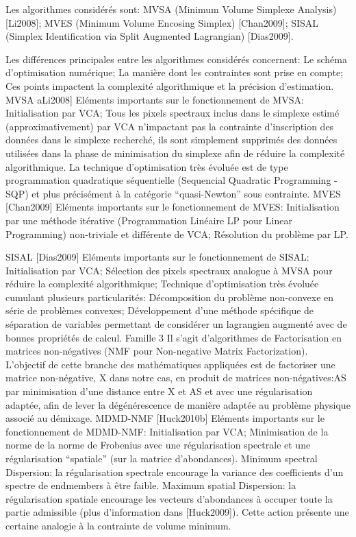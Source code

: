 Les algorithmes considérés sont: MVSA (Minimum Volume Simplexe
Analysis) [Li2008]; MVES (Minimum Volume Encosing Simplex)
[Chan2009]; SISAL (Simplex Identification via Split Augmented
Lagrangian) [Dias2009]. 

Les différences principales entre les algorithmes considérés
concernent: 
Le schéma d'optimisation numérique; 
La manière dont les
contraintes sont prise en compte; 
Ces points impactent la complexité
algorithmique et la précision d'estimation.  MVSA aLi2008] Eléments
  importants sur le fonctionnement de MVSA: Initialisation par VCA;
  Tous les pixels spectraux inclus dans le simplexe estimé
  (approximativement) par VCA n'impactant pas la contrainte
  d'inscription des données dans le simplexe recherché, ils sont
  simplement supprimés des données utilisées dans la phase de
  minimisation du simplexe afin de réduire la complexité
  algorithmique.  La technique d'optimisation très évoluée est de type
  programmation quadratique séquentielle (Sequencial Quadratic
  Programming - SQP) et plus précisément à la catégorie
  ``quasi-Newton'' sous contrainte.  MVES [Chan2009] Eléments
  importants sur le fonctionnement de MVES: Initialisation par une
  méthode itérative (Programmation Linéaire LP pour Linear
  Programming) non-triviale et différente de VCA; Résolution du
  problème par LP.

  SISAL [Dias2009]
Eléments importants sur le fonctionnement de SISAL: Initialisation
par VCA; 
Sélection des pixels spectraux analogue à MVSA pour réduire
la complexité algorithmique; 
Technique d'optimisation très évoluée
cumulant plusieurs particularités: 
Décomposition du problème
non-convexe en série de problèmes convexes; 
Développement d'une
méthode spécifique de séparation de variables permettant de considérer
un lagrangien augmenté avec de bonnes propriétés de calcul.  
Famille 3
Il s'agit d'algorithmes de Factorisation en matrices non-négatives
(NMF pour Non-negative Matrix Factorization). L'objectif de cette
branche des mathématiques appliquées est de factoriser une matrice
non-négative, X dans notre cas, en produit de matrices
non-négatives:AS par minimisation d'une distance entre X et AS et
avec une régularisation adaptée, afin de lever la dégénérescence de
manière adaptée au problème physique associé au démixage.  MDMD-NMF
[Huck2010b] Eléments importants sur le fonctionnement de MDMD-NMF:
Initialisation par VCA; 
Minimisation de la norme de la norme de
Frobenius avec une régularisation spectrale et une régularisation
``spatiale'' (sur la matrice d'abondances).  
Minimum spectral
Dispersion: la régularisation spectrale encourage la variance des
coefficients d'un spectre de endmembers à être faible.  Maximum
spatial Dispersion: la régularisation spatiale encourage les vecteurs
d'abondances à occuper toute la partie admissible (plus d'information
dans [Huck2009]). Cette action présente une certaine analogie à la
contrainte de volume minimum.

